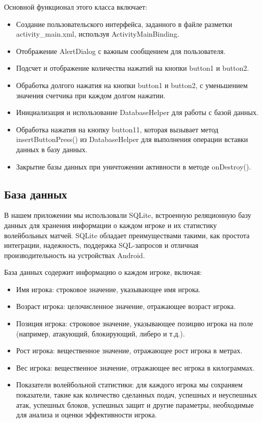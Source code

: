 \documentclass[12pt]{article}
\begin{document}
    Основной функционал этого класса включает:
    \begin{itemize}

        \item Создание пользовательского интерфейса, заданного в файле разметки activity_main.xml, используя ActivityMainBinding.
        \item  Отображение AlertDialog с важным сообщением для пользователя.
        \item Подсчет и отображение количества нажатий на кнопки button1 и button2.
        \item Обработка долгого нажатия на кнопки button1 и button2, с уменьшением значения счетчика при каждом долгом нажатии.
        \item Инициализация и использование DatabaseHelper для работы с базой данных.
        \item Обработка нажатия на кнопку button11, которая вызывает метод insertButtonPress() из DatabaseHelper для выполнения операции вставки данных в базу данных.
        \item Закрытие базы данных при уничтожении активности в методе onDestroy().
    \end{itemize}

    \subsection{База данных}

    В нашем приложении мы использовали SQLite, встроенную реляционную базу данных для хранения информации о каждом игроке и их статистику волейбольных матчей. SQLite обладает преимуществами такими, как простота интеграции, надежность, поддержка SQL-запросов и отличная производительность на устройствах Android.

    База данных содержит информацию о каждом игроке, включая:

    \begin{itemize}
        \item Имя игрока: строковое значение, указывающее имя игрока.
        \item Возраст игрока: целочисленное значение, отражающее возраст игрока.
        \item Позиция игрока: строковое значение, указывающее позицию игрока на поле (например, атакующий, блокирующий, либеро и т.д.).
        \item Рост игрока: вещественное значение, отражающее рост игрока в метрах.
        \item Вес игрока: вещественное значение, отражающее вес игрока в килограммах.
        \item Показатели волейбольной статистики: для каждого игрока мы сохраняем показатели, такие как количество сделанных подач, успешных и неуспешных атак, успешных блоков, успешных защит и другие параметры, необходимые для анализа и оценки эффективности игрока.
    \end{itemize}
\end{document}
